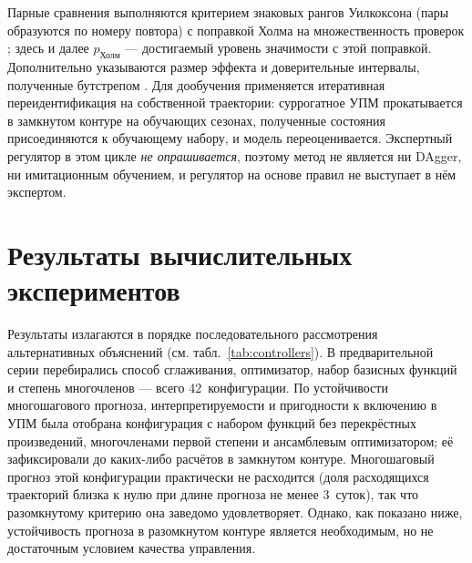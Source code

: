 \documentclass[12pt,a4paper,leqno]{article}
\begin{document}
Парные сравнения выполняются критерием знаковых рангов Уилкоксона (пары
образуются по номеру повтора) \cite{wilcoxon1945} с поправкой Холма на множественность
проверок \cite{holm1979}; здесь и далее $p_{\text{Холм}}$ — достигаемый уровень
значимости с этой поправкой. Дополнительно указываются размер эффекта и доверительные
интервалы, полученные бутстрепом \cite{efron1994,demsar2006}. Для дообучения
применяется итеративная переидентификация на собственной траектории: суррогатное УПМ
прокатывается в замкнутом контуре на обучающих сезонах, полученные состояния
присоединяются к обучающему набору, и модель переоценивается. Экспертный регулятор в
этом цикле \emph{не опрашивается}, поэтому метод не является ни DAgger, ни имитационным
обучением, и регулятор на основе правил не выступает в нём экспертом.

\section{Результаты вычислительных экспериментов}
\label{sec:results}

Результаты излагаются в порядке последовательного рассмотрения альтернативных объяснений
(см. табл.~\ref{tab:controllers}). В предварительной серии перебирались способ
сглаживания, оптимизатор, набор базисных функций и степень многочленов — всего
42~конфигурации. По устойчивости многошагового прогноза, интерпретируемости и пригодности к
включению в УПМ была отобрана конфигурация с набором функций без перекрёстных
произведений, многочленами первой степени и ансамблевым оптимизатором; её зафиксировали
до каких-либо расчётов в замкнутом контуре. Многошаговый прогноз этой конфигурации
практически не расходится (доля расходящихся траекторий близка к нулю при длине
прогноза не менее 3~суток), так что разомкнутому критерию она заведомо удовлетворяет.
Однако, как показано ниже, устойчивость прогноза в разомкнутом контуре является
необходимым, но не достаточным условием качества управления.
\end{document}
